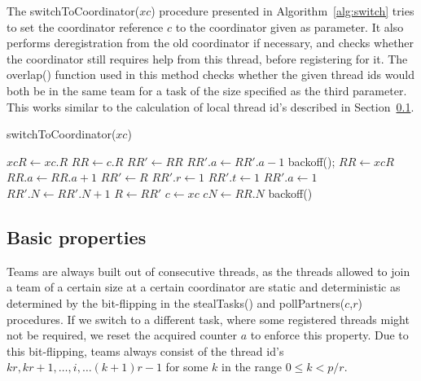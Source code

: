 \documentclass[preprint]{sigplanconf}
\begin{document}
The switchToCoordinator($xc$) procedure presented in
Algorithm~\ref{alg:switch} tries to set the coordinator reference $c$
to the coordinator given as parameter. It also performs deregistration
from the old coordinator if necessary, and checks whether the
coordinator still requires help from this thread, before registering
for it. The overlap() function used in this method checks whether the
given thread ids would both be in the same team for a task of the size
specified as the third parameter. This works similar to the
calculation of local thread id's described in Section~\ref{sec:prop}.

\begin{algorithm}
\caption{switchToCoordinator($xc$)}\label{alg:switch}
\begin{algorithmic}[1]
\LOOP
	\STATE $xcR \gets xc.R$
			\STATE {}
			\STATE $RR \gets c.R$
				\STATE {}
				\RETURN
			\ENDIF
			\STATE $RR' \gets RR$
			\STATE $RR'.a \gets RR'.a - 1$
				\STATE backoff();
			\ELSE
				\RETURN
			\ENDIF
		\ELSE
			\STATE $RR \gets xcR$
			\STATE $RR.a \gets RR.a + 1$
				\STATE {}
					\STATE {}
					\STATE $RR' \gets R$
					\STATE $RR'.r \gets 1$
					\STATE $RR'.t \gets 1$
					\STATE $RR'.a \gets 1$
					\STATE $RR'.N \gets RR'.N + 1$
					\STATE $R \gets RR'$
				\ENDIF
				\STATE $c \gets xc$
				\STATE $cN \gets RR.N$
			\ELSE
				\STATE backoff()
			\ENDIF
		\ENDIF
	\ELSE
		\RETURN
	\ENDIF
\ENDLOOP

\end{algorithmic}
\end{algorithm}

\subsection{Basic properties}
\label{sec:prop}

Teams are always built out of consecutive threads, as the threads
allowed to join a team of a certain size at a certain coordinator are
static and deterministic as determined by the bit-flipping in the
stealTasks() and pollPartners($c$,$r$) procedures.  If we switch to a
different task, where some registered threads might not be required,
we reset the acquired counter $a$ to enforce this property. Due to
this bit-flipping, teams always consist of the thread id's
$kr,kr+1,\ldots,i,\ldots (k+1)r-1$ for some $k$ in the range $0 \leq k
< p/r$.
\end{document}
